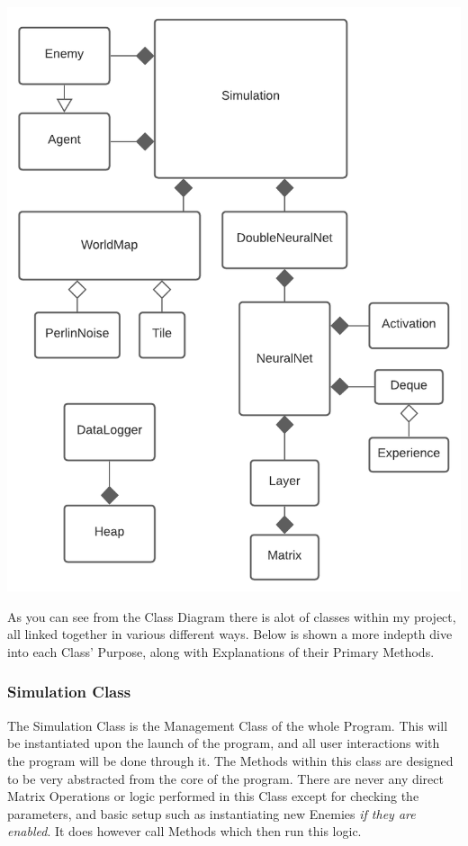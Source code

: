 \begin{flushleft}
            \vspace{0.5cm}
            \centerline{\includegraphics[width=.65\textwidth]{Images/Design/SimplifiedClassDiagram.png}}
            \vspace{0.5cm}

            As you can see from the Class Diagram there is alot of classes within my project, all linked together in various different ways. 
            Below is shown a more indepth dive into each Class' Purpose, along with Explanations of their Primary Methods.\\
            \subsubsection{Simulation Class}
                The Simulation Class is the Management Class of the whole Program. This will be instantiated upon the launch of the program, and all user
                interactions with the program will be done through it. The Methods within this class are designed to be very abstracted from the core
                of the program. There are never any direct Matrix Operations or logic performed in this Class except for checking the parameters, and
                basic setup such as instantiating new Enemies \textit{if they are enabled}. It does however call Methods which then run this logic.


\end{flushleft}
